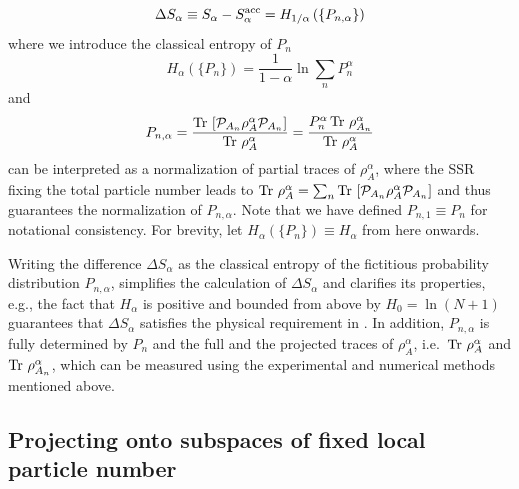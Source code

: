 %
\begin{equation}
    \Delta S_{\alpha}\equiv  S_{\alpha} - S_{\alpha}^{{\rm acc}} = H_{{1}/{\alpha}}\left(\{P_{n,\alpha}\}\right)
\label{eq:S_alpha_acc5}
\end{equation}
%
where we introduce the classical \ren entropy of $P_n$
%
\begin{equation}
    H_{\alpha}\left(\{P_n\}\right)=\frac{1}{1-\alpha}\ln\sum_n P_n^{\alpha} 
\label{eq:Halpha}
\end{equation}
%
and
%
\begin{equation}
    P_{n,\alpha}=\frac{\operatorname{Tr}\, \left[{\mathcal{P}}_{A_{n}} \rho_A^{\alpha} {\mathcal{P}}_{A_{n}}\right]}{\operatorname{Tr}\, \rho_A^{\alpha}}=\frac{ P_n^\alpha\operatorname{Tr}\, \rho_{A_n}^{\alpha}}{\operatorname{Tr}\, \rho_A^{\alpha}}
\label{eq:Pna}
\end{equation}
%
can be interpreted as a normalization of partial traces of $\rho_A^{\alpha}$, where the SSR fixing the total particle number leads to $\operatorname{Tr}\, \rho_A^{\alpha}=\sum_n \operatorname{Tr}\, \left[{\mathcal{P}}_{A_{n}} \rho_A^{\alpha} {\mathcal{P}}_{A_{n}}\right]$ and thus guarantees the normalization of $P_{n,\alpha}$. Note that we have defined $P_{n,1} \equiv P_n$ for notational consistency. For brevity, let $H_{\alpha}(\{P_n\}) \equiv H_{\alpha}$ from here onwards. 

Writing the difference $\Delta S_{\alpha}$ as the classical \ren entropy of the fictitious probability distribution $P_{n,\alpha}$, simplifies the calculation of $\Delta S_{\alpha}$ and clarifies its properties, e.g., the fact that $H_{\alpha}$  is positive and bounded from above by $ H_{0}=\ln(N+1)$ guarantees that $\Delta S_{\alpha}$ satisfies the physical requirement in . In addition, $P_{n,\alpha}$ is fully determined by $P_n$ and the full and the projected traces of $\rho_A^{\alpha}$, i.e.~$\operatorname{Tr}\, \rho_{A}^{\alpha}$ and $\operatorname{Tr}\, \rho_{A_n}^{\alpha}$, which can be measured using the experimental and numerical methods mentioned above.   

\subsection{Projecting onto subspaces of fixed local particle number}
	
